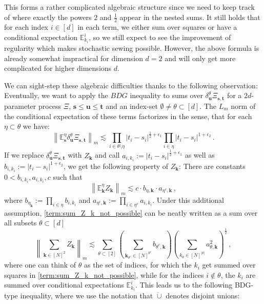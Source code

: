 \documentclass[11pt,oneside,english,reqno]{amsart}
\numberwithin{equation}{section}
\numberwithin{figure}{section}
\theoremstyle{plain}
\theoremstyle{definition}
\theoremstyle{remark}
\theoremstyle{plain}
\theoremstyle{plain}
\theoremstyle{plain}
\theoremstyle{plain}
\theoremstyle{plain}
\newcommand{\EE}{\mathbb{E}}
\newcommand{\bk}{\mathbf{k}}
\newcommand{\bu}{\mathbf{u}}
\newcommand{\bs}{\mathbf{s}}
\newcommand{\bt}{\mathbf{t}}
\newcommand{\norm}[1]{\left\lVert #1\right\rVert}
\newcommand{\abs}[1]{\left\lvert #1\right\rvert}
\begin{document}
%
This forms a rather complicated algebraic structure since we need to keep track of where exactly the powers $2$ and $\frac 12$ appear in the nested sums. It still holds that for each index $i\in[d]$ in each term, we either sum over squares or have a conditional expectation $\EE^i_{k_i}$, so we still expect to see the improvement of regularity which makes stochastic sewing possible. However, the above formula is already somewhat impractical for dimension $d=2$ and will only get more complicated for higher dimensions $d$.

We can sight-step these algebraic difficulties thanks to the following observation: Eventually, we want to apply the $BDG$ inequality to sums over $\delta_\bu^\theta \Xi_{\bs,\bt}$ for a $2d$-parameter process $\Xi$, $\bs\le\bu\le\bt$ and an index-set $\emptyset\neq\theta\subset[d]$. The $L_m$ norm of the conditional expectation of these terms factorizes in the sense, that for each $\eta\subset\theta$ we have:
%
\begin{equation*}
    \norm{\EE^\eta_\bs\delta_\bu^\theta\Xi_{\bs,\bt}}_m \lesssim \prod_{i\in\theta\setminus\eta}\abs{t_i-s_i}^{\frac 12+\epsilon_1} \prod_{i\in\eta}\abs{t_i-s_i}^{1+\epsilon_2}\,.
\end{equation*}
%
 If we replace $\delta^\theta_\bu\Xi_{\bs,\bt}$ with $Z_\bk$ and call  $a_{i,k_i} := \abs{t_i-s_i}^{\frac 12+\epsilon_1}$ as well as $b_{i,k_i} := \abs{t_i-s_i}^{1+\epsilon_2}$, we get the following property of $Z_\bk$: There are constants $0< b_{i,k_i}, a_{i,k_i},c$ such that
%
\begin{equation*}
    \norm{\EE^\eta_\bk Z_\bk}_m\lesssim c\cdot b_{\eta,\bk}\cdot a_{\eta^c,\bk}\,,
\end{equation*}
%
where $b_{\eta_\bk} := \prod_{i\in\eta} b_{i,k_i}$ and $a_{\eta^c,\bk} := \prod_{i\in\eta^c} a_{i,k_i}$. Under this additional assumption, \eqref{term:sum_Z_k_not_possible} can be neatly written as a sum over all subsets $\theta\subset[d]$
%
\begin{equation*}
    \norm{\sum_{\bk\in[N]^2} Z_\bk}_m \lesssim \sum_{\theta\subset[2]}\left(\sum_{\bk_{\theta^c}\in[N]^{\theta^c}} b_{\theta^c,\bk}\right)\left(\sum_{k_\theta\in[N]^{\abs\theta}} a_{\theta,\bk}^2\right)^{\frac 12}\,,
\end{equation*}
%
where one can think of $\theta$ as the set of indices, for which the $k_i$ get summed over squares in \eqref{term:sum_Z_k_not_possible}, while for the indices $i\notin\theta$, the $k_i$ are summed over conditional expectations $\EE^i_{k_i}$. This leads us to the following BDG-type inequality, where we use the notation that $\dot\cup$ denotes disjoint unions:
\end{document}

